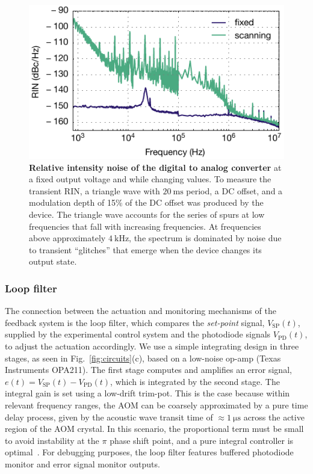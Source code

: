 \documentclass[twocolumn,aip,rsi,reprint,bibnotes]{revtex4-1}
\newcommand\unit[2]{\ensuremath{#1~\mathrm{{#2}}}}
\begin{document}
\begin{figure}
  \begin{center}
    \includegraphics{Figure9.pdf}
    \caption{\textbf{Relative intensity noise of the digital to analog converter} at a fixed output voltage and while changing values. To measure the transient RIN, a triangle wave with \unit{20}{ms} period, a DC offset, and a modulation depth of 15\% of the DC offset was produced by the device. The triangle wave accounts for the series of spurs at low frequencies that fall with increasing frequencies. At frequencies above approximately \unit{4}{kHz}, the spectrum is dominated by noise due to transient ``glitches'' that emerge when the device changes its output state.}\label{fig:da_rin}
  \end{center}
\end{figure}


\subsubsection{Loop filter}

The connection between the actuation and monitoring mechanisms of the feedback system is the loop filter, which compares the \emph{set-point} signal, $V_\mathrm{SP}(t)$, supplied by the experimental control system and the photodiode signals $V_\mathrm{PD}(t)$, to adjust the actuation accordingly.
We use a simple integrating design in three stages, as seen in Fig.~\ref{fig:circuits}(c), based on a low-noise op-amp (Texas Instruments OPA211).
The first stage computes and amplifies an error signal, $e(t)=V_\mathrm{SP}(t)-V_\mathrm{PD}(t)$, which is integrated by the second stage.
The integral gain is set using a low-drift trim-pot.
This is the case because within relevant frequency ranges, the AOM can be coarsely approximated by a pure time delay process, given by the acoustic wave transit time of $\approx$\unit{1}{\mu{}s} across the active region of the AOM crystal.
In this scenario, the proportional term must be small to avoid instability at the $\pi$ phase shift point, and a pure integral controller is optimal~\cite{Skogestad2003}.
For debugging purposes, the loop filter features buffered photodiode monitor and error signal monitor outputs.
\end{document}
